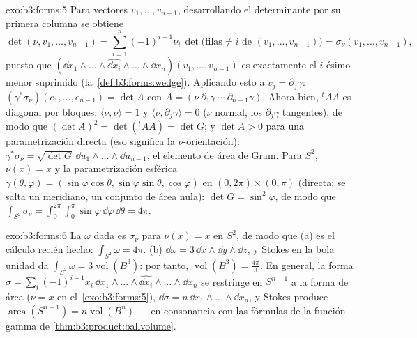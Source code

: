 \begin{solution}{exo:b3:forms:5}
Para vectores $v_1, \dots, v_{n-1}$, desarrollando el determinante por
su primera columna se obtiene
\[
\det(\nu, v_1, \dots, v_{n-1}) =
\sum_{i=1}^n(-1)^{i-1}\nu_i\,
\det\bigl(\text{filas} \neq i \text{ de } (v_1, \dots,
v_{n-1})\bigr)
= \sigma_\nu(v_1, \dots, v_{n-1}),
\]
puesto que $(\dd x_1\wedge\dots\wedge\widehat{\dd
x_i}\wedge\dots\wedge\dd x_n)(v_1, \dots, v_{n-1})$ es exactamente el
$i$-ésimo menor suprimido (la~\cref{def:b3:forms:wedge}). Aplicando esto
a $v_j =
\partial_j\gamma$: $(\gamma^*\sigma_\nu)(e_1, \dots,
e_{n-1}) = \det A$ con $A = (\nu\ \partial_1\gamma\ \cdots\
\partial_{n-1}\gamma)$. Ahora bien, ${}^t\!AA$ es diagonal por bloques:
$\langle\nu, \nu\rangle = 1$ y $\langle\nu,
\partial_j\gamma\rangle = 0$ ($\nu$ normal, los $\partial_j\gamma$
tangentes), de modo que $(\det A)^2 =
\det({}^t\!AA) = \det G$; y $\det A > 0$ para una parametrización
directa (eso significa la $\nu$-orientación):
$\gamma^*\sigma_\nu = \sqrt{\det G}\,\dd
u_1\wedge\dots\wedge\dd u_{n-1}$, el elemento de área de Gram. Para
$S^2$, $\nu(x) = x$ y la parametrización esférica
$\gamma(\theta, \varphi) = (\sin\varphi\cos\theta,
\sin\varphi\sin\theta, \cos\varphi)$ en $(0,2\pi)\times(0,\pi)$
(directa; se salta un meridiano, un conjunto de área nula):
$\det G = \sin^2\varphi$, de modo que
$\int_{S^2}\sigma_\nu =
\int_0^{2\pi}\!\!\int_0^\pi\sin\varphi\,\dd\varphi\,
\dd\theta = 4\pi$.
\end{solution}

\begin{solution}{exo:b3:forms:6}
La $\omega$ dada es $\sigma_\nu$ para $\nu(x) = x$ en $S^2$, de modo que
(a) es el cálculo recién hecho: $\int_{S^2}\omega = 4\pi$. (b)
$\dd\omega = 3\,\dd
x\wedge\dd y\wedge\dd z$, y Stokes en la bola unidad da
$\int_{S^2}\omega = 3\operatorname{vol}(B^3)$: por tanto,
$\operatorname{vol}(B^3) = \frac{4\pi}3$. En general, la forma
$\sigma = \sum_i(-1)^{i-1}x_i\,\dd
x_1\wedge\dots\wedge\widehat{\dd x_i}\wedge\dots\wedge\dd
x_n$ se restringe en $S^{n-1}$ a la forma de área ($\nu = x$ en
el~\cref{exo:b3:forms:5}), $\dd\sigma = n\,\dd
x_1\wedge\dots\wedge\dd x_n$, y Stokes produce
$\operatorname{area}(S^{n-1}) = n\operatorname{vol}(B^n)$
--- en consonancia con las fórmulas de la función gamma de
\cref{thm:b3:product:ballvolume}.
\end{solution}

